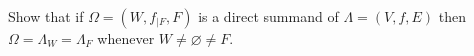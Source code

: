 Show that if $\Omega = (W, f_{|F}, F)$ is a direct summand of $\Lambda = (V, f, E)$ then $\Omega = \Lambda_W = \Lambda_F$ whenever $W \neq \varnothing \neq F$.
